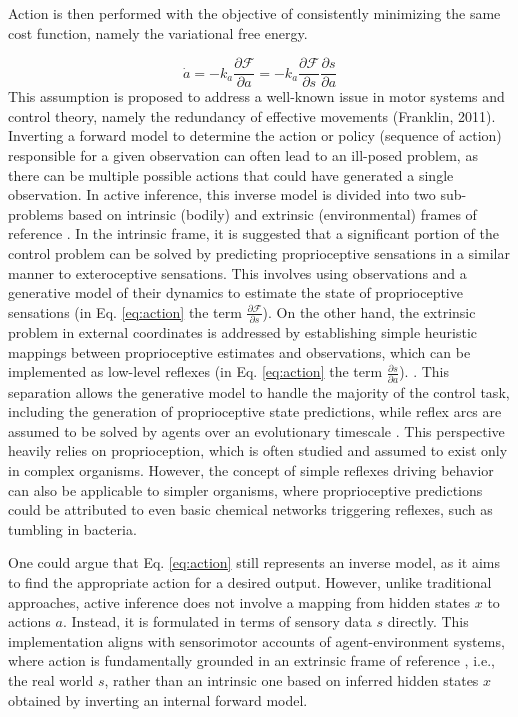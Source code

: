 \documentclass[10pt]{article}
\begin{document}
Action is then performed with the objective of consistently minimizing the same cost function, namely the variational free energy.

\begin{equation}
    \dot{a} = - k_a \frac{\partial \mathcal{F}}{\partial a} = -k_a \frac{\partial \mathcal{F}}{\partial s} \frac{\partial s}{\partial a} 
    \label{eq:action}
\end{equation}
This assumption is proposed to address a well-known issue in motor systems and control theory, namely the redundancy of effective movements (Franklin, 2011). Inverting a forward model to determine the action or policy (sequence of action) responsible for a given observation \citep{Kawato1999} can often lead to an ill-posed problem, as there can be multiple possible actions that could have generated a single observation. In active inference, this inverse model is divided into two sub-problems based on intrinsic (bodily) and extrinsic (environmental) frames of reference \citep{Friston2011}.
In the intrinsic frame, it is suggested that a significant portion of the control problem can be solved by predicting proprioceptive sensations in a similar manner to exteroceptive sensations. This involves using observations and a generative model of their dynamics to estimate the state of proprioceptive sensations (in Eq. \ref{eq:action} the term $\frac{\partial \mathcal{F}}{\partial s}$). 
On the other hand, the extrinsic problem in external coordinates is addressed by establishing simple heuristic mappings between proprioceptive estimates and observations, which can be implemented as low-level reflexes (in Eq. \ref{eq:action} the term $\frac{\partial s}{\partial a}$). . 
This separation allows the generative model to handle the majority of the control task, including the generation of proprioceptive state predictions, while reflex arcs are assumed to be solved by agents over an evolutionary timescale \citep{Friston2010b}. This perspective heavily relies on proprioception, which is often studied and assumed to exist only in complex organisms. However, the concept of simple reflexes driving behavior can also be applicable to simpler organisms, where proprioceptive predictions could be attributed to even basic chemical networks triggering reflexes, such as tumbling in bacteria.

One could argue that Eq. \ref{eq:action} still represents an inverse model, as it aims to find the appropriate action for a desired output. However, unlike traditional approaches, active inference does not involve a mapping from hidden states $x$ to actions $a$. Instead, it is formulated in terms of sensory data $s$ directly. This implementation aligns with sensorimotor accounts of agent-environment systems, where action is fundamentally grounded in an extrinsic frame of reference \citep{Buhrmann2014}, i.e., the real world $s$, rather than an intrinsic one based on inferred hidden states $x$ obtained by inverting an internal forward model.
\end{document}
